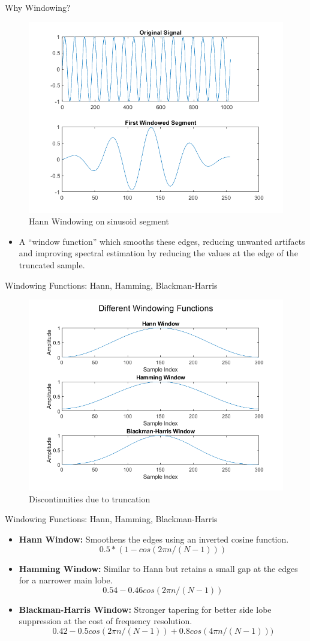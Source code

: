 \documentclass[10pt]{beamer}
\begin{document}
\begin{frame}{Why Windowing?}
  \begin{figure}
    \centering
    \includegraphics[width=0.6\linewidth]{figures/Hann_window.png}
    \caption{Hann Windowing on sinusoid segment}
    \label{fig:1}
\end{figure}
\begin{itemize}
    \item A “window function” which smooths these edges, reducing unwanted artifacts and improving spectral estimation by reducing the values at the edge of the truncated sample.
    \end{itemize}
\end{frame}

\begin{frame}{Windowing Functions: Hann, Hamming, Blackman-Harris}
  \begin{figure}
    \centering
    \includegraphics[width=0.6\linewidth]{figures/windowing_functions.png}
    \caption{Discontinuities due to truncation}
    \label{fig:1}
\end{figure}
\end{frame}

\begin{frame}{Windowing Functions: Hann, Hamming, Blackman-Harris}
  \begin{itemize}
    \item \textbf{Hann Window:} Smoothens the edges using an inverted cosine function.
      \[
0.5*(1-cos(2\pi n / (N - 1)))
  \]
    \item \textbf{Hamming Window:} Similar to Hann but retains a small gap at the edges for a narrower main lobe.
          \[
0.54-0.46cos(2\pi n / (N - 1))
  \]
    \item \textbf{Blackman-Harris Window:} Stronger tapering for better side lobe suppression at the cost of frequency resolution.
                  \[
0.42-0.5cos(2\pi n / (N - 1))+0.8cos(4\pi n / (N - 1)))
  \]
  \end{itemize}
\end{frame}
\end{document}
